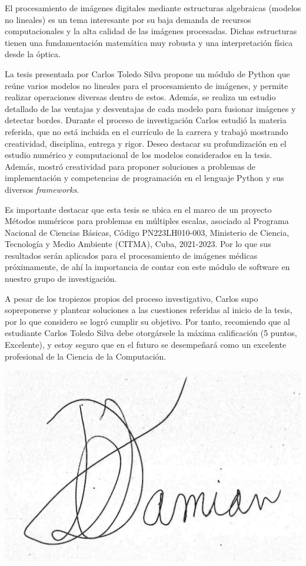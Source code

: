 \begin{opinion}
    El procesamiento de imágenes digitales mediante estructuras algebraicas (modelos no lineales) es un tema interesante por su baja demanda de recursos computacionales y la alta calidad de las imágenes procesadas. Dichas estructuras tienen una fundamentación matemática muy robusta y una interpretación física desde la óptica.
    
    La tesis presentada por Carlos Toledo Silva propone un módulo de Python que reúne varios modelos no lineales para el procesamiento de imágenes, y permite realizar operaciones diversas dentro de estos. Además, se realiza un estudio detallado de las ventajas y desventajas de cada modelo para fusionar imágenes y detectar bordes. Durante el proceso de investigación Carlos estudió la materia referida, que no está incluida en el currículo de la carrera y trabajó mostrando creatividad, disciplina, entrega y rigor. Deseo destacar su profundización en el estudio numérico y computacional de los modelos considerados en la tesis. Además, mostró creatividad para proponer soluciones a problemas de implementación y competencias de programación en el lenguaje Python y sus diversos \textit{frameworks}.
    
    Es importante destacar que esta tesis se ubica en el marco de un proyecto Métodos numéricos para problemas en múltiples escalas, asociado al Programa Nacional de Ciencias Básicas, Código PN223LH010-003, Ministerio de Ciencia, Tecnología y Medio Ambiente (CITMA), Cuba, 2021-2023. Por lo que sus resultados serán aplicados para el procesamiento de imágenes médicas próximamente, de ahí la importancia de contar con este módulo de software en nuestro grupo de investigación.
    
    A pesar de los tropiezos propios del proceso investigativo, Carlos supo sopreponerse y plantear soluciones a las cuestiones referidas al inicio de la tesis, por lo que considero se logró cumplir su objetivo.
    Por tanto, recomiendo que al estudiante Carlos Toledo Silva debe otorgársele la máxima calificación (5 puntos, Excelente), y estoy seguro que en el futuro se desempeñará como un excelente profesional de la Ciencia de la Computación.
    
    \begingroup
    \centering
    	\includegraphics[width=5.0 cm]{graphics/firma_del_tutor.jpg}
    	
    \par
    \endgroup
\end{opinion}